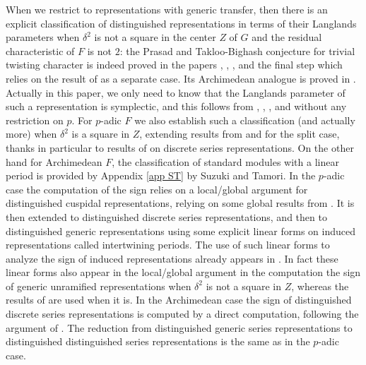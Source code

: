 \documentclass[11pt,letterpaper]{amsart}
\def\d{\delta}
\theoremstyle{plain}
\numberwithin{equation}{section}
\begin{document}
When we restrict to representations with generic transfer, then there is an explicit classification of distinguished representations in terms of their Langlands parameters when $\delta^2$ is not a square in the center $Z$ of $G$ and the residual characteristic of $F$ is not $2$: the Prasad and Takloo-Bighash conjecture for trivial twisting character is indeed proved in the papers \cite{X}, \cite{SuzJNT}, \cite{SPTB}, and the final step \cite{SX} which relies on the result of \cite{Ch} as a separate case. Its Archimedean analogue is proved in \cite{ST}. Actually in this paper, we only need to know that the Langlands parameter of such a representation is symplectic, and this follows from \cite{ST}, \cite{X}, \cite{SuzJNT}, \cite{SX} and \cite{Ch} without any restriction on $p$. For $p$-adic $F$ we also establish such a classification (and actually more) when $\d^2$ is a square in $Z$, extending results from \cite{MatCRELLE} and \cite{MatJNT} for the split case, thanks in particular to results of \cite{BW} on discrete series representations. On the other hand for Archimedean $F$, the classification of standard modules with a linear period is provided by Appendix \ref{app ST} by Suzuki and Tamori. In the $p$-adic case the computation of the sign relies on a local/global argument for distinguished cuspidal representations, relying on some global results from \cite{XZ}. It is then extended to distinguished discrete series representations, and then to distinguished generic representations using some explicit linear forms on induced representations called intertwining periods. The use of such linear forms to analyze the sign of induced representations already appears in \cite[Lemma 3.5]{LM}. In fact these linear forms also appear in the local/global argument in the computation the sign of generic unramified representations when 
$\d^2$ is not a square in $Z$, whereas the results of \cite{FJ} are used when it is. In the Archimedean case the sign of distinguished discrete series representations is computed by a direct computation, following the argument of \cite[Theorem 4]{P}. The reduction from distinguished generic series representations to distinguished distinguished series representations is the same as in the $p$-adic case. 
\end{document}
